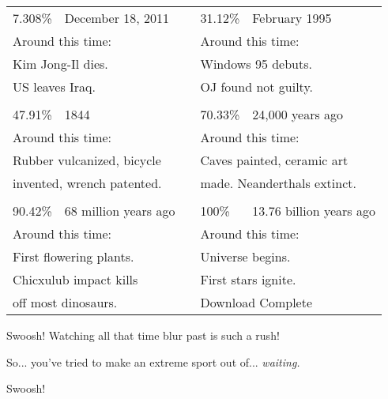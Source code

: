 \documentclass{article}
\begin{document}
\begin{table}
\centering
\begin{tabular}{|l|l|c@{\quad }|l|l|}
\cline{1-2} \cline{4-5}
7.308\% & December 18, 2011 & & 31.12\% & February 1995 \\
\cline{1-2} \cline{4-5}
\multicolumn{2}{|l|}{Around this time:} & & \multicolumn{2}{|l|}{Around this time:} \\
\multicolumn{2}{|l|}{Kim Jong-Il dies.} & & \multicolumn{2}{|l|}{Windows 95 debuts.} \\
\multicolumn{2}{|l|}{US leaves Iraq.} & & \multicolumn{2}{|l|}{OJ found not guilty.} \\
\cline{1-2} \cline{4-5}
\multicolumn{5}{c}{}\\
\cline{1-2} \cline{4-5}
47.91\% & 1844 & & 70.33\% & 24,000 years ago \\
\cline{1-2} \cline{4-5}
\multicolumn{2}{|l|}{Around this time:} & & \multicolumn{2}{|l|}{Around this time:} \\
\multicolumn{2}{|l|}{Rubber vulcanized, bicycle} & & \multicolumn{2}{|l|}{Caves painted, ceramic art} \\
\multicolumn{2}{|l|}{invented, wrench patented.} & & \multicolumn{2}{|l|}{made.  Neanderthals extinct.} \\
\cline{1-2} \cline{4-5}
\multicolumn{5}{c}{}\\
\cline{1-2} \cline{4-5}
90.42\% & 68 million years ago & & 100\% & 13.76 billion years ago \\
\cline{1-2} \cline{4-5}
\multicolumn{2}{|l|}{Around this time:} & & \multicolumn{2}{|l|}{Around this time:} \\
\multicolumn{2}{|l|}{First flowering plants.} & & \multicolumn{2}{|l|}{Universe begins.} \\
\multicolumn{2}{|l|}{Chicxulub impact kills} & & \multicolumn{2}{|l|}{First stars ignite.} \\
\cline{4-5}
\multicolumn{2}{|l|}{off most dinosaurs.} & & \multicolumn{2}{|l|}{Download Complete} \\
\cline{1-2} \cline{4-5}
\end{tabular}
\end{table}
\newpage
Swoosh! Watching all that time blur past is such a rush!

So... you've tried to make an extreme sport out of... {\em waiting.}

\Large Swoosh!
\end{document}

